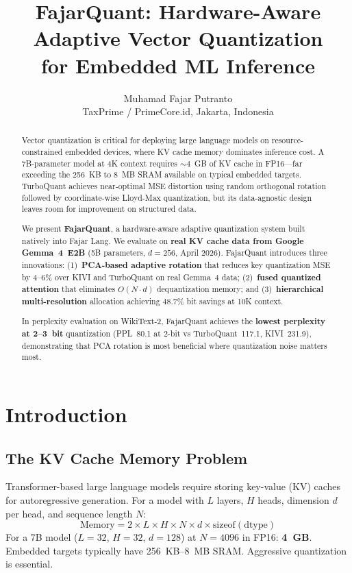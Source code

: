 \documentclass[10pt,twocolumn]{article}
\title{FajarQuant: Hardware-Aware Adaptive Vector Quantization\\for Embedded ML Inference}
\author{Muhamad Fajar Putranto\\TaxPrime / PrimeCore.id, Jakarta, Indonesia}
\date{}
\begin{document}
\maketitle

\begin{abstract}
Vector quantization is critical for deploying large language models on resource-constrained embedded devices, where KV cache memory dominates inference cost. A 7B-parameter model at 4K context requires ${\sim}4$~GB of KV cache in FP16---far exceeding the 256~KB to 8~MB SRAM available on typical embedded targets. TurboQuant \citep{zandieh2025turboquant} achieves near-optimal MSE distortion using random orthogonal rotation followed by coordinate-wise Lloyd-Max quantization, but its data-agnostic design leaves room for improvement on structured data.

We present \textbf{FajarQuant}, a hardware-aware adaptive quantization system built natively into Fajar Lang. We evaluate on \textbf{real KV cache data from Google Gemma~4~E2B} \citep{gemma2026} (5B parameters, $d{=}256$, April 2026). FajarQuant introduces three innovations: (1)~\textbf{PCA-based adaptive rotation} that reduces key quantization MSE by 4--6\% over KIVI and TurboQuant on real Gemma~4 data; (2)~\textbf{fused quantized attention} that eliminates $O(N \cdot d)$ dequantization memory; and (3)~\textbf{hierarchical multi-resolution} allocation achieving 48.7\% bit savings at 10K context.

In perplexity evaluation on WikiText-2, FajarQuant achieves the \textbf{lowest perplexity at 2--3~bit} quantization (PPL~80.1 at 2-bit vs TurboQuant~117.1, KIVI~231.9), demonstrating that PCA rotation is most beneficial where quantization noise matters most.
\end{abstract}

\section{Introduction}

\subsection{The KV Cache Memory Problem}

Transformer-based large language models require storing key-value (KV) caches for autoregressive generation. For a model with $L$ layers, $H$ heads, dimension $d$ per head, and sequence length $N$:
\begin{equation}
\text{Memory} = 2 \times L \times H \times N \times d \times \text{sizeof}(\text{dtype})
\end{equation}
For a 7B model ($L{=}32$, $H{=}32$, $d{=}128$) at $N{=}4096$ in FP16: \textbf{4~GB}. Embedded targets typically have 256~KB--8~MB SRAM. Aggressive quantization is essential.
\end{document}
